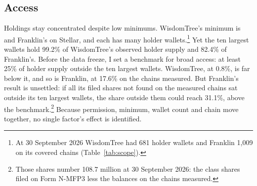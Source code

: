 \documentclass[12pt,a4paper]{article}
\begin{document}
\subsection{Access}\label{sec:m3}
Holdings stay concentrated despite low minimums. WisdomTree's minimum is  and Franklin's  on Stellar, and each has many holder wallets.\footnote{At 30 September 2026 WisdomTree had 681 holder wallets and Franklin 1{,}009 on its covered chains (Table~\ref{tab:scope}).} Yet the ten largest wallets hold 99.2\% of WisdomTree's observed holder supply and 82.4\% of Franklin's. Before the data freeze, I set a benchmark for broad access: at least 25\% of holder supply outside the ten largest wallets. WisdomTree, at 0.8\%, is far below it, and so is Franklin, at 17.6\% on the chains measured. But Franklin's result is unsettled: if all its filed shares not found on the measured chains sat outside its ten largest wallets, the share outside them could reach 31.1\%, above the benchmark.\footnote{Those shares number 108.7 million at 30 September 2026: the class shares filed on Form \mbox{N-MFP3} less the balances on the chains measured.} Because permission, minimum, wallet count and chain move together, no single factor's effect is identified.
\end{document}
